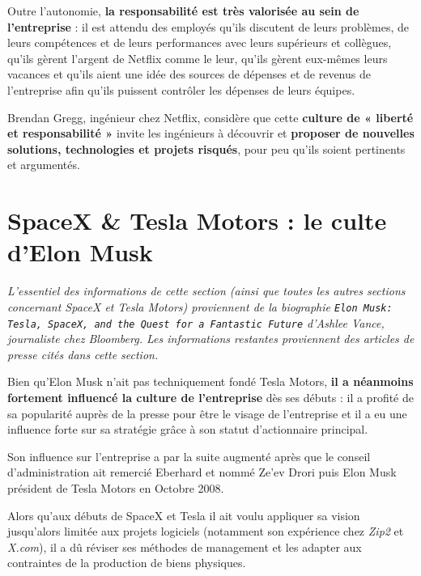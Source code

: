 \vspace{5mm}

Outre l'autonomie, \textbf{la responsabilité est très valorisée au sein de l'entreprise} : il est attendu des employés qu'ils discutent de leurs problèmes, de leurs compétences et de leurs performances avec leurs supérieurs et collègues, qu'ils gèrent l'argent de Netflix comme le leur, qu'ils gèrent eux-mêmes leurs vacances et qu'ils aient une idée des sources de dépenses et de revenus de l’entreprise afin qu’ils puissent contrôler les dépenses de leurs équipes. 

Brendan Gregg\supercite{WorkingAtNetflix}, ingénieur chez Netflix, considère que cette \textbf{culture de « liberté et responsabilité »} invite les ingénieurs à découvrir et \textbf{proposer de nouvelles solutions, technologies et projets risqués}, pour peu qu'ils soient pertinents et argumentés. 

\section{SpaceX \& Tesla Motors : le culte d'Elon Musk}

\textit{L'essentiel des informations de cette section (ainsi que toutes les autres sections concernant SpaceX et Tesla Motors) proviennent de la biographie \texttt{Elon Musk: Tesla, SpaceX, and the Quest for a Fantastic Future}\supercite{ElonMuskBiography} d'Ashlee Vance, journaliste chez Bloomberg. Les informations restantes proviennent des articles de presse cités dans cette section.} 

\vspace{5mm}

Bien qu'Elon Musk n'ait pas techniquement fondé Tesla Motors, \textbf{il a néanmoins fortement influencé la culture de l'entreprise} dès ses débuts : il a profité de sa popularité auprès de la presse pour être le visage de l'entreprise et il a eu une influence forte sur sa stratégie grâce à son statut d'actionnaire principal.

Son influence sur l'entreprise a par la suite augmenté après que le conseil d'administration ait remercié Eberhard et nommé Ze'ev Drori puis Elon Musk président de Tesla Motors en Octobre 2008\supercite{MuskTeslaCEO}.

Alors qu'aux débuts de SpaceX et Tesla il ait voulu appliquer sa vision jusqu'alors limitée aux projets logiciels (notamment son expérience chez \textit{Zip2} et \textit{X.com}), il a dû réviser ses méthodes de management et les adapter aux contraintes de la production de biens physiques.

